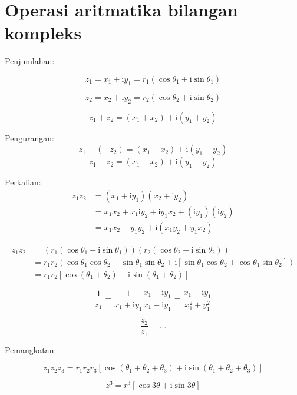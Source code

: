 \section{Operasi aritmatika bilangan kompleks}

Penjumlahan:

\[
z_{1}=x_{1}+\mathrm{i}y_{1}=r_{1}\left(\cos\theta_{1}+\mathrm{i}\sin\theta_{1}\right)
\]

\[
z_{2} = x_{2} + \mathrm{\mathrm{i}}y_{2}=r_{2}\left(\cos\theta_{2}+\mathrm{i}\sin\theta_{2}\right)
\]

\[
z_{1}+z_{2}=(x_{1}+x_{2})+\mathrm{i}\left(y_{1}+y_{2}\right)
\]

Pengurangan:
\[
z_{1}+(-z_{2})=(x_{1}-x_{2})+\mathrm{i}\left(y_{1}-y_{2}\right)
\]
\[
z_{1}-z_{2}=(x_{1}-x_{2})+\mathrm{i}\left(y_{1}-y_{2}\right)
\]

Perkalian:
\begin{align*}
z_{1}z_{2} & =\left(x_{1}+\mathrm{i}y_{1}\right)\left(x_{2}+\mathrm{\mathrm{i}}y_{2}\right)\\
 & =x_{1}x_{2}+x_{1}\mathrm{i}y_{2}+\mathrm{i}y_{1}x_{2}+(\mathrm{i}y_{1})(\mathrm{i}y_{2})\\
 & =x_{1}x_{2}-y_{1}y_{2}+\mathrm{i}\left(x_{1}y_{2}+y_{1}x_{2}\right)
\end{align*}

\begin{align*}
z_{1}z_{2} & =\left(r_{1}\left(\cos\theta_{1}+\mathrm{i}\sin\theta_{1}\right)\right)\left(r_{2}\left(\cos\theta_{2}+\mathrm{i}\sin\theta_{2}\right)\right)\\
 & =r_{1}r_{2}\left(\cos\theta_{1}\cos\theta_{2}-\sin\theta_{1}\sin\theta_{2}+\mathrm{i}\left[\sin\theta_{1}\cos\theta_{2}+\cos\theta_{1}\sin\theta_{2}\right]\right)\\
 & =r_{1}r_{2}\left[\cos\left(\theta_{1}+\theta_{2}\right)+\mathrm{i}\sin\left(\theta_{1}+\theta_{2}\right)\right]
\end{align*}

\[
\frac{1}{z_{1}}=\frac{1}{x_{1}+\mathrm{i}y_{1}}\frac{x_{1}-\mathrm{i}y_{1}}{x_{1}-\mathrm{i}y_{1}}=\frac{x_{1}-\mathrm{i}y_{1}}{x_{1}^{2}+y_{1}^{2}}
\]

\[
\frac{z_{2}}{z_{1}}=...
\]

Pemangkatan

\[
z_{1}z_{2}z_{3}=r_{1}r_{2}r_{3}\left[\cos\left(\theta_{1}+\theta_{2}+\theta_{3}\right)+\mathrm{i}\sin\left(\theta_{1}+\theta_{2}+\theta_{3}\right)\right]
\]

\[
z^{3}=r^{3}\left[\cos3\theta+\mathrm{i}\sin3\theta\right]
\]

